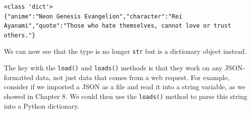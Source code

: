 \begin{lstlisting}[style=none]
<class 'dict'>
{"anime":"Neon Genesis Evangelion","character":"Rei Ayanami","quote":"Those who hate themselves, cannot love or trust others."}
\end{lstlisting}
We can now see that the type is no longer \verb|str| but is a dictionary object instead.\par
The key with the \verb|load()| and \verb|loads()| methods is that they work on any JSON-formatted data, not just data that comes from a web request. For example, consider if we imported a JSON as a file and read it into a string variable, as we showed in Chapter 8. We could then use the \verb|loads()| method to parse this string into a Python dictionary.

